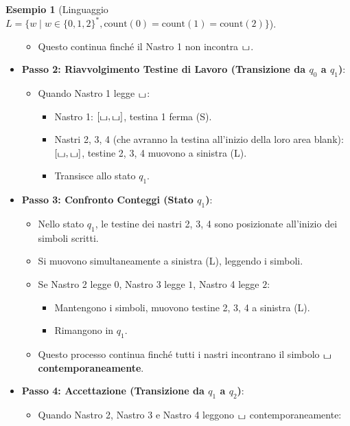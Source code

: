 \documentclass[a4paper]{article}
\theoremstyle{definition} %
\newtheorem{example}{Esempio}
\newcommand{\blankS}{\ensuremath{\raisebox{-0.15ex}{\scalebox{1.3}[0.7]{$\sqcup$}}}}
\begin{document}
\begin{example}[Linguaggio $L = \{w \mid w \in \{0,1,2\}^*, \text{count}(0)=\text{count}(1)=\text{count}(2)\}$]
\begin{itemize}
\begin{itemize}
            \item Questo continua finché il Nastro 1 non incontra $\blankS$.
        \end{itemize}
    \item \textbf{Passo 2: Riavvolgimento Testine di Lavoro (Transizione da $q_0$ a $q_1$)}:
        \begin{itemize}
            \item Quando Nastro 1 legge $\blankS$:
                \begin{itemize}
                    \item Nastro 1: $[\blankS, \blankS]$, testina 1 ferma (S).
                    \item Nastri 2, 3, 4 (che avranno la testina all'inizio della loro area blank): $[\blankS, \blankS]$, testine 2, 3, 4 muovono a sinistra (L).
                    \item Transisce allo stato $q_1$.
                \end{itemize}
        \end{itemize}
    \item \textbf{Passo 3: Confronto Conteggi (Stato $q_1$)}:
        \begin{itemize}
            \item Nello stato $q_1$, le testine dei nastri 2, 3, 4 sono posizionate all'inizio dei simboli scritti.
            \item Si muovono simultaneamente a sinistra (L), leggendo i simboli.
            \item Se Nastro 2 legge $0$, Nastro 3 legge $1$, Nastro 4 legge $2$:
                \begin{itemize}
                    \item Mantengono i simboli, muovono testine 2, 3, 4 a sinistra (L).
                    \item Rimangono in $q_1$.
                \end{itemize}
            \item Questo processo continua finché tutti i nastri incontrano il simbolo $\blankS$ \textbf{contemporaneamente}.
        \end{itemize}
    \item \textbf{Passo 4: Accettazione (Transizione da $q_1$ a $q_2$)}:
        \begin{itemize}
            \item Quando Nastro 2, Nastro 3 e Nastro 4 leggono $\blankS$ contemporaneamente:
                \begin{itemize}

\end{itemize}
\end{itemize}
\end{itemize}
\end{example}
\end{document}
